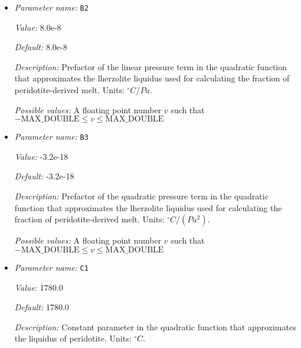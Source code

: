 \begin{itemize}
{\it Value:} 1475.0


{\it Default:} 1475.0


{\it Description:} Constant parameter in the quadratic function that approximates the lherzolite liquidus used for calculating the fraction of peridotite-derived melt. Units: ${}^\circ C$.


{\it Possible values:} A floating point number $v$ such that $-\text{MAX\_DOUBLE} \leq v \leq \text{MAX\_DOUBLE}$
\item {\it Parameter name:} {\tt B2}
\label{parameters:Material model/Melt simple/B2}
\label{parameters:Material_20model/Melt_20simple/B2}


{\it Value:} 8.0e-8


{\it Default:} 8.0e-8


{\it Description:} Prefactor of the linear pressure term in the quadratic function that approximates the  lherzolite liquidus used for calculating the fraction of peridotite-derived melt. Units: ${}^\circ C/Pa$.


{\it Possible values:} A floating point number $v$ such that $-\text{MAX\_DOUBLE} \leq v \leq \text{MAX\_DOUBLE}$
\item {\it Parameter name:} {\tt B3}
\label{parameters:Material model/Melt simple/B3}
\label{parameters:Material_20model/Melt_20simple/B3}


{\it Value:} -3.2e-18


{\it Default:} -3.2e-18


{\it Description:} Prefactor of the quadratic pressure term in the quadratic function that approximates the  lherzolite liquidus used for calculating the fraction of peridotite-derived melt. Units: ${}^\circ C/(Pa^2)$.


{\it Possible values:} A floating point number $v$ such that $-\text{MAX\_DOUBLE} \leq v \leq \text{MAX\_DOUBLE}$
\item {\it Parameter name:} {\tt C1}
\label{parameters:Material model/Melt simple/C1}
\label{parameters:Material_20model/Melt_20simple/C1}


{\it Value:} 1780.0


{\it Default:} 1780.0


{\it Description:} Constant parameter in the quadratic function that approximates the liquidus of peridotite. Units: ${}^\circ C$.



\end{itemize}
